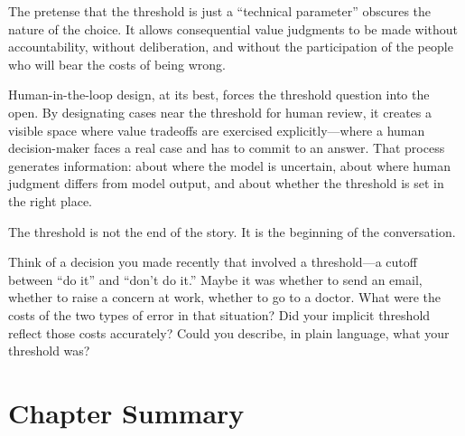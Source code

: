 The pretense that the threshold is just a ``technical parameter'' obscures the nature of the choice. It allows consequential value judgments to be made without accountability, without deliberation, and without the participation of the people who will bear the costs of being wrong.

Human-in-the-loop design, at its best, forces the threshold question into the open. By designating cases near the threshold for human review, it creates a visible space where value tradeoffs are exercised explicitly---where a human decision-maker faces a real case and has to commit to an answer. That process generates information: about where the model is uncertain, about where human judgment differs from model output, and about whether the threshold is set in the right place.

The threshold is not the end of the story. It is the beginning of the conversation.


\begin{trythis}
Think of a decision you made recently that involved a threshold---a cutoff between ``do it'' and ``don't do it.'' Maybe it was whether to send an email, whether to raise a concern at work, whether to go to a doctor. What were the costs of the two types of error in that situation? Did your implicit threshold reflect those costs accurately? Could you describe, in plain language, what your threshold was?
\end{trythis}

\section*{Chapter Summary}

